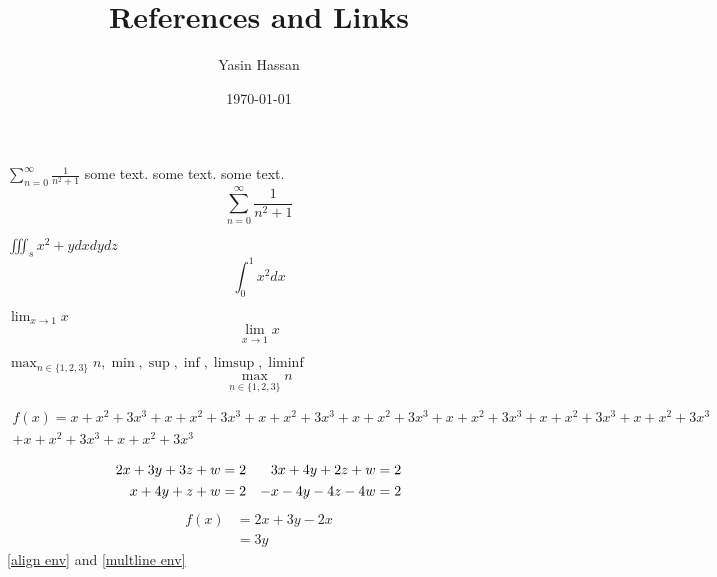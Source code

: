 \documentclass{article}
\title{References and Links}
\author{Yasin Hassan}
\date{\today}
\begin{document}
\maketitle

$\sum_{n=0}^{\infty}\frac{1}{n^{2}+1}$ some text. some text. some text.
\[\sum_{n=0}^{\infty}\frac{1}{n^{2}+1}\]

$\iiint_sx^2+ydxdydz$ %
\[\int_{0}^1x^2dx\] %

$\lim_{x\to 1}x$
\[\lim_{x\to 1}x\]

$\max_{n\in \{1,2,3\}}n, \min, \sup, \inf, \limsup, \liminf$
\[\max_{n\in \{1,2,3\}}n\]

\begin{multline}\label{multline env}%
    f(x)=x+x^2+3x^3+x+x^2+3x^3+x+x^2+3x^3+x+x^2+3x^3+x+x^2+3x^3+x+x^2+3x^3+x+x^2+3x^3\\+x+x^2+3x^3+x+x^2+3x^3
\end{multline}

\begin{align}\label{align env} %
    2x+3y+3z+w&=2 &3x+4y+2z+w&=2\\
    x+4y+z+w&=2 & -x-4y-4z-4w&=2\notag
\end{align}
\begin{align*}
    f(x)&=2x+3y-2x\\
    &= 3y
\end{align*}
\eqref{align env} and \eqref{multline env}
\end{document}

